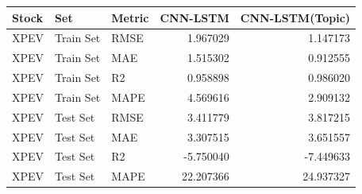 \begin{tabular}{lllrr}
\toprule
Stock & Set & Metric & CNN-LSTM & CNN-LSTM(Topic) \\
\midrule
XPEV & Train Set & RMSE & 1.967029 & 1.147173 \\
XPEV & Train Set & MAE & 1.515302 & 0.912555 \\
XPEV & Train Set & R2 & 0.958898 & 0.986020 \\
XPEV & Train Set & MAPE & 4.569616 & 2.909132 \\
XPEV & Test Set & RMSE & 3.411779 & 3.817215 \\
XPEV & Test Set & MAE & 3.307515 & 3.651557 \\
XPEV & Test Set & R2 & -5.750040 & -7.449633 \\
XPEV & Test Set & MAPE & 22.207366 & 24.937327 \\
\bottomrule
\end{tabular}
